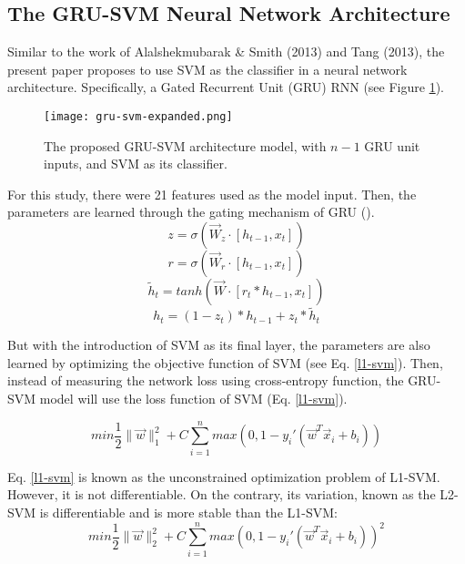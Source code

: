\subsection{The GRU-SVM Neural Network Architecture}
Similar to the work of Alalshekmubarak \& Smith (2013)\cite{Alalshekmubarak} and Tang (2013)\cite{Tang}, the present paper proposes to use SVM as the classifier in a neural network architecture. Specifically, a Gated Recurrent Unit (GRU) RNN (see Figure \ref{fig:proposed-model}).

\begin{figure}[!htb]
\centering
	\texttt{[image: gru-svm-expanded.png]}
	\caption{The proposed GRU-SVM architecture model, with $n-1$ GRU unit inputs, and SVM as its classifier.}
	\label{fig:proposed-model}
\endminipage\hfill
\end{figure}

\indent	For this study, there were 21 features used as the model input. Then, the parameters are learned through the gating mechanism of GRU\cite{Cho} ().
\begin{equation}\label{z-gate}
z	=	\sigma(\vec{W}_{z} \cdot [h_{t - 1}, x_{t}])
\end{equation}
\begin{equation}\label{r-gate}
r	=	\sigma(\vec{W}_{r} \cdot [h_{t - 1}, x_{t}])
\end{equation}
\begin{equation}\label{candidate-value}
\tilde{h}_{t}	=	tanh(\vec{W} \cdot [r_{t} * h_{t - 1}, x_{t}])
\end{equation}
\begin{equation}\label{new-value}
h_{t}	=	(1 - z_{t}) * h_{t - 1} + z_{t} * \tilde{h}_{t}
\end{equation}

But with the introduction of SVM as its final layer, the parameters are also learned by optimizing the objective function of SVM (see Eq. \ref{l1-svm}). Then, instead of measuring the network loss using cross-entropy function, the GRU-SVM model will use the loss function of SVM (Eq. \ref{l1-svm}).

\begin{equation}\label{l1-svm}
min \dfrac{1}{2}\|\vec{w}\|_{1}^{2} + C \sum_{i = 1}^{n} max(0, 1 - y_{i}'(\vec{w}^{T}\vec{x}_{i}+b_{i}))
\end{equation}

Eq. \ref{l1-svm} is known as the unconstrained optimization problem of L1-SVM. However, it is not differentiable. On the contrary, its variation, known as the L2-SVM is differentiable and is more stable\cite{Tang} than the L1-SVM:
\begin{equation}\label{l2-svm}
min \dfrac{1}{2}\|\vec{w}\|_{2}^{2} + C \sum_{i = 1}^{n} max(0, 1 - y_{i}'(\vec{w}^{T}\vec{x}_{i}+b_{i}))^{2}
\end{equation}

